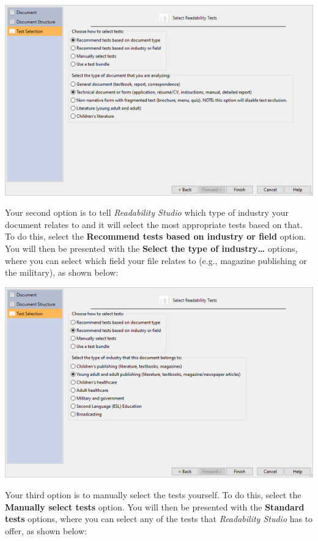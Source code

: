 \documentclass[
]{book}
\theoremstyle{definition}
\theoremstyle{definition}
\theoremstyle{definition}
\theoremstyle{definition}
\theoremstyle{remark}
\begin{document}
\includegraphics{Images/wizarddoctypetechselected.png}

Your second option is to tell \emph{Readability Studio} which type of industry your document relates to and it will select the most appropriate tests based on that. To do this, select the \textbf{Recommend tests based on industry or field} option. You will then be presented with the \textbf{Select the type of industry\ldots{}} options, where you can select which field your file relates to (e.g., magazine publishing or the military), as shown below:

\includegraphics{Images/wizardindustry.png}

Your third option is to manually select the tests yourself. To do this, select the \textbf{Manually select tests} option. You will then be presented with the \textbf{Standard tests} options, where you can select any of the tests that \emph{Readability Studio} has to offer, as shown below:
\end{document}
